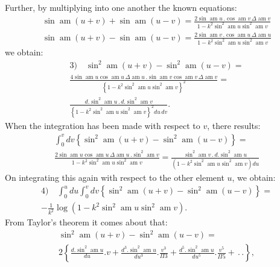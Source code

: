 \documentclass{article}
\begin{document}
Further, by multiplying into one another the known equations:
\[
\begin{gathered}
\sin\operatorname{am}(u+v)+\sin\operatorname{am}(u-v)=\frac{2\sin\operatorname{am}u\,.\cos\operatorname{am}v\,\Delta\operatorname{am}v}{1-k^{2}\sin^{2}\operatorname{am}u\sin^{2}\operatorname{am}v}\\[1.5ex]
\sin\operatorname{am}(u+v)-\sin\operatorname{am}(u-v)=\frac{2\sin\operatorname{am}v\,.\cos\operatorname{am}u\,\Delta\operatorname{am}u}{1-k^{2}\sin^{2}\operatorname{am}u\sin^{2}\operatorname{am}v}
\end{gathered}
\]
we obtain:
\[
\begin{gathered}
\text{3)}\quad\sin^{2}\operatorname{am}(u+v)-\sin^{2}\operatorname{am}(u-v)=\\[1.5ex]
\frac{4\sin\operatorname{am}u\cos\operatorname{am}u\,\Delta\operatorname{am}u\,.\sin\operatorname{am}v\cos\operatorname{am}v\,\Delta\operatorname{am}v}{\left\{1-k^{2}\sin^{2}\operatorname{am}u\sin^{2}\operatorname{am}v\right\}^{2}}=\\[1.5ex]
\frac{d.\sin^{2}\operatorname{am}u\,.\,d.\sin^{2}\operatorname{am}v}{\left\{1-k^{2}\sin^{2}\operatorname{am}u\sin^{2}\operatorname{am}v\right\}^{2}du\,dv}.
\end{gathered}
\]
When the integration has been made with respect to $v$, there results:
\[
\begin{gathered}
\int_{0}^{v}dv\left\{\sin^{2}\operatorname{am}(u+v)-\sin^{2}\operatorname{am}(u-v)\right\}=\\[1.5ex]
\frac{2\sin\operatorname{am}u\cos\operatorname{am}u\,\Delta\operatorname{am}u\,.\sin^{2}\operatorname{am}v}{1-k^{2}\sin^{2}\operatorname{am}u\sin^{2}\operatorname{am}v}=\frac{\sin^{2}\operatorname{am}v\,.\,d.\sin^{2}\operatorname{am}u}{\left(1-k^{2}\sin^{2}\operatorname{am}u\sin^{2}\operatorname{am}v\right)du}
\end{gathered}
\]
On integrating this again with respect to the other element $u$, we obtain:
\[
\begin{gathered}
\text{4)}\quad\int_{0}^{u}du\int_{0}^{v}dv\left\{\sin^{2}\operatorname{am}(u+v)-\sin^{2}\operatorname{am}(u-v)\right\}=\\[1.5ex]
-\frac{1}{k^{2}}\log\left(1-k^{2}\sin^{2}\operatorname{am}u\sin^{2}\operatorname{am}v\right).
\end{gathered}
\]
From Taylor's theorem it comes about that:
\[
\begin{gathered}
\sin^{2}\operatorname{am}(u+v)-\sin^{2}\operatorname{am}(u-v)=\\[1.5ex]
2\left\{\frac{d.\sin^{2}\operatorname{am}u}{du}.v+\frac{d^{3}.\sin^{2}\operatorname{am}u}{du^{3}}.\frac{v^{3}}{\Pi 3}+\frac{d^{5}.\sin^{2}\operatorname{am}u}{du^{5}}.\frac{v^{5}}{\Pi 5}+\,.\,.\right\},
\end{gathered}
\]
\end{document}
